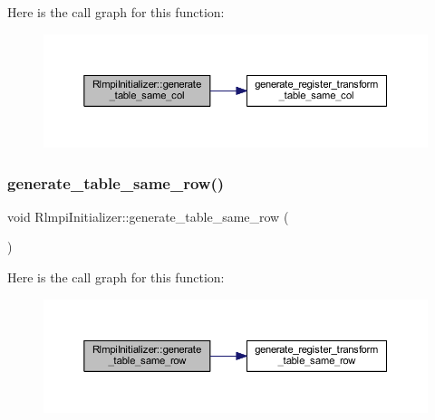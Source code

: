 Here is the call graph for this function\+:
\nopagebreak
\begin{figure}[H]
\begin{center}
\leavevmode
\includegraphics[width=350pt]{classRlmpiInitializer_aacafe4bfcbd2d27b6c63904ac431c966_cgraph}
\end{center}
\end{figure}
\mbox{\label{classRlmpiInitializer_ad1b5f8433f2f02756f4f522d552b8c0c}} 
\subsubsection{\texorpdfstring{generate\_table\_same\_row()}{generate\_table\_same\_row()}\hspace{0.1cm}{\footnotesize\ttfamily [1/2]}}
{\footnotesize\ttfamily void Rlmpi\+Initializer\+::generate\+\_\+table\+\_\+same\+\_\+row (\begin{DoxyParamCaption}{ }\end{DoxyParamCaption})\hspace{0.3cm}{\ttfamily [protected]}}

Here is the call graph for this function\+:
\nopagebreak
\begin{figure}[H]
\begin{center}
\leavevmode
\includegraphics[width=350pt]{classRlmpiInitializer_ad1b5f8433f2f02756f4f522d552b8c0c_cgraph}
\end{center}
\end{figure}
\mbox{\label{classRlmpiInitializer_ad1b5f8433f2f02756f4f522d552b8c0c}} 

